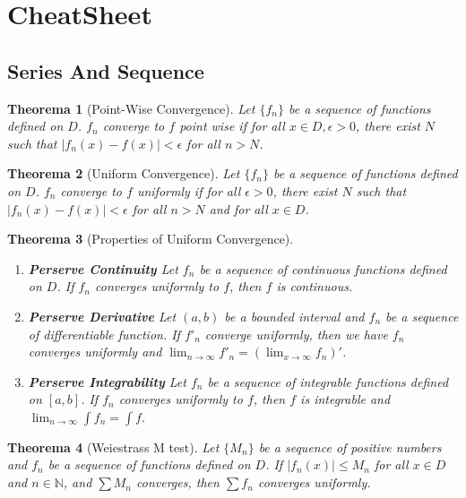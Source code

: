 \documentclass[12pt, a4paper]{article}
\newtheorem{theorem}{Theorema}
\theoremstyle{definition}
\theoremstyle{remark}
\newcommand{\bb}[1]{\mathbb{#1}}
\begin{document}
\section{CheatSheet}

\subsection{Series And Sequence}

\begin{theorem}[Point-Wise Convergence]
	Let $\{f_n\}$ be a sequence of functions defined on $D$. $f_n$ converge to $f$ point wise if for all $x \in D, \epsilon >0$, there exist $N$ such that $|f_n(x) - f(x)| < \epsilon$ for all $n > N$.
\end{theorem}

\begin{theorem}[Uniform Convergence]
	Let $\{f_n\}$ be a sequence of functions defined on $D$. $f_n$ converge to $f$ uniformly if for all $\epsilon > 0$, there exist $N$ such that $|f_n(x) - f(x)| < \epsilon$ for all $n > N$ and for all $x \in D$.
\end{theorem}

\begin{theorem}[Properties of Uniform Convergence] 
	\begin{enumerate}
		\item \textbf{Perserve Continuity} Let $f_n$ be a sequence of continuous functions defined on $D$. If $f_n$ converges uniformly to $f$, then $f$ is continuous.
		\item \textbf{Perserve Derivative} Let $(a,b)$ be a bounded interval and $f_n$ be a sequence of differentiable function. If $f'_n$ converge uniformly, then we have $f_n$ converges uniformly and $\lim_{n \rightarrow  \infty} f'_n = (\lim_{x \rightarrow \infty} f_n)'$.
		\item \textbf{Perserve Integrability} Let $f_n$ be a sequence of integrable functions defined on $[a,b]$. If $f_n$ converges uniformly to $f$, then $f$ is integrable and $\lim_{n \rightarrow \infty} \int f_n = \int f$.
\end{enumerate}
\end{theorem}
\begin{theorem}[Weiestrass M test]
	Let $\{M_n\}$ be a sequence of positive numbers and $f_n$ be a sequence of functions defined on $D$. If $|f_n(x)| \leq M_n$ for all $x \in D$ and $n \in \bb{N}$, and $\sum M_n$ converges, then $\sum f_n$ converges uniformly.
\end{theorem}
\end{document}
